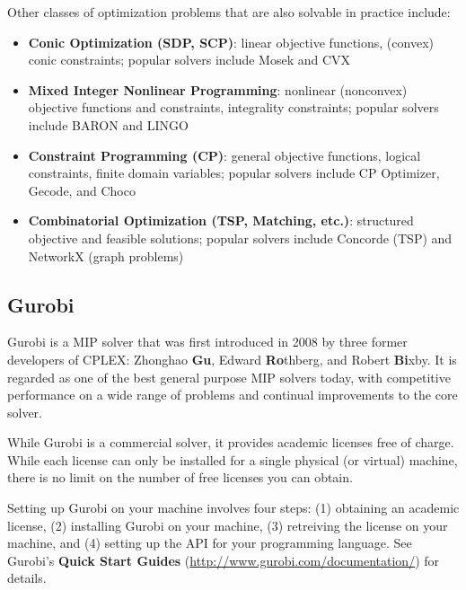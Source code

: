 \documentclass[12pt]{article}
\begin{document}
Other classes of optimization problems that are also solvable in practice include:
\begin{itemize}
    \item \textbf{Conic Optimization (SDP, SCP)}: linear objective functions, (convex) conic constraints; popular solvers include Mosek and CVX
    \item \textbf{Mixed Integer Nonlinear Programming}: nonlinear (nonconvex) objective functions and constraints, integrality constraints; popular solvers include BARON and LINGO
    \item \textbf{Constraint Programming (CP)}: general objective functions, logical constraints, finite domain variables; popular solvers include CP Optimizer, Gecode, and Choco
    \item \textbf{Combinatorial Optimization (TSP, Matching, etc.)}: structured objective and feasible solutions; popular solvers include Concorde (TSP) and NetworkX (graph problems)
\end{itemize}



\subsection{Gurobi}
Gurobi is a MIP solver that was first introduced in 2008 by three former developers of CPLEX: Zhonghao \textbf{Gu}, Edward \textbf{Ro}thberg, and Robert \textbf{Bi}xby.
It is regarded as one of the best general purpose MIP solvers today, with competitive performance on a wide range of problems and continual improvements to the core solver.

While Gurobi is a commercial solver, it provides academic licenses free of charge.
While each license can only be installed for a single physical (or virtual) machine, there is no limit on the number of free licenses you can obtain.

Setting up Gurobi on your machine involves four steps: (1) obtaining an academic license, (2) installing Gurobi on your machine, (3) retreiving the license on your machine, and (4) setting up the API for your programming language.
See Gurobi's \textbf{Quick Start Guides} (\url{http://www.gurobi.com/documentation/}) for details.
\end{document}
